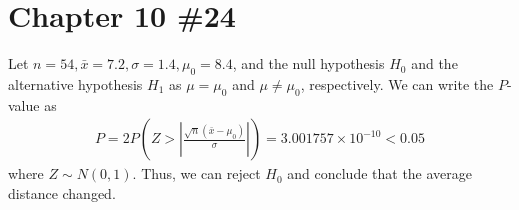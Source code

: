 \documentclass{scrartcl}
\begin{document}
\section{Chapter 10 \#24}
Let \(n = 54, \bar{x} = 7.2, \sigma = 1.4, \mu_0 = 8.4\), and the null
hypothesis \(H_0\) and the alternative hypothesis \(H_1\) as \(\mu = \mu_0\)
and \(\mu \not = \mu_0\), respectively. We can write the \(P\)-value as
\begin{align*}
  P
  = 2P \left( Z
    > \left| \frac{\sqrt{n} (\bar{x} - \mu_0)}{\sigma} \right| \right)
    = 3.001757 \times 10^{-10} < 0.05
\end{align*}
where \(Z \sim N(0, 1)\). Thus, we can reject \(H_0\) and conclude that the
average distance changed.
\end{document}
